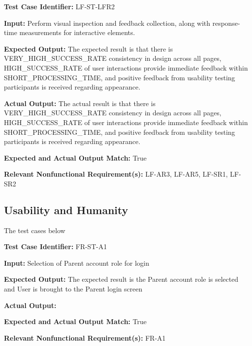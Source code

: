 \documentclass[12pt, titlepage]{article}
\begin{document}
\begin{mdframed}[linewidth=0.5mm] \par
  \textbf{Test Case Identifier:} LF-ST-LFR2 \par
  \textbf{Input:} Perform visual inspection and feedback collection, along with response-time measurements for interactive elements. \par
  \textbf{Expected Output:} The expected result is that there is \\VERY\_HIGH\_SUCCESS\_RATE consistency in design across all pages, \\HIGH\_SUCCESS\_RATE of user interactions provide immediate feedback within SHORT\_PROCESSING\_TIME, and positive feedback from usability testing participants is received regarding appearance. \par
  \textbf{Actual Output:} The actual result is that there is \\VERY\_HIGH\_SUCCESS\_RATE consistency in design across all pages, \\HIGH\_SUCCESS\_RATE of user interactions provide immediate feedback within SHORT\_PROCESSING\_TIME, and positive feedback from usability testing participants is received regarding appearance. \par
  \textbf{Expected and Actual Output Match:} True \par
  \textbf{Relevant Nonfunctional Requirement(s):} LF-AR3, LF-AR5, LF-SR1, LF-SR2
\end{mdframed}
		
\subsection{Usability and Humanity}
\hspace{2em}The test cases below 

\begin{mdframed}[linewidth=0.5mm] \par
  \textbf{Test Case Identifier:} FR-ST-A1 \par
  \textbf{Input:} Selection of Parent account role for login \par
  \textbf{Expected Output:} The expected result is the Parent account role is selected and User is brought to the Parent login screen \par
  \textbf{Actual Output:} \par
  \textbf{Expected and Actual Output Match:} True \par
  \textbf{Relevant Nonfunctional Requirement(s):} FR-A1
\end{mdframed}
\end{document}
